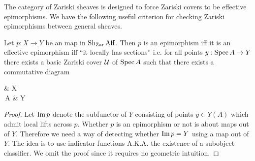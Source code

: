 \documentclass[./main.tex]{subfiles}
\begin{document}
The category of Zariski sheaves is designed to force
Zariski covers to be effective epimorphisms.
We have the following useful criterion for
checking Zariski epimorphisms between general sheaves.
\begin{prop}
  
  Let $p : X \to Y$ be an map in $\operatorname{Sh}_{\mathrm{Zar}} \mathrm{Aff}$.
  Then $p$ is an epimorphism iff it is an effective epimorphism 
  iff ``it locally has sections''
  i.e. for all points $y : \operatorname{Spec} A \to Y$
  there exists a basic Zariski cover $\mathcal{U}$ of $\operatorname{Spec} A$ such that
  there exists a commutative diagram
  \begin{cd}
    {} & X \\
    {\SPEC\,A} & Y
    \arrow["p", from=1-2, to=2-2]
    \arrow["y"', from=2-1, to=2-2]
    \arrow[from=1-1, to=2-1]
    \arrow["{\exists \,x}", dashed, from=1-1, to=1-2]
  \end{cd}
\end{prop}
\begin{proof}
  
  Let $\operatorname{Im} p$ denote the subfunctor of $Y$
  consisting of points $y \in Y(A)$ which admit local lifts across $p$.
  Whether $p$ is an epimorphism or not
  is about maps out of $Y$.
  Therefore we need a way of detecting whether $\operatorname{Im} p = Y$
  using a map out of $Y$.
  The idea is to use indicator functions A.K.A.
  the existence of a subobject classifier.
  We omit the proof since it requires no geometric intuition.





\end{proof}
\end{document}
